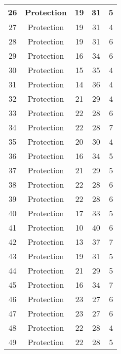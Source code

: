 \documentclass[results.tex]{subfiles}
\begin{document}
\begin{center}
\begin{tabular}{| c || c | c | c | c |}
    \hline
    26 & Protection & 19 & 31 & 5 \\ 
    \hline
    27 & Protection & 19 & 31 & 4 \\ 
    \hline
    28 & Protection & 19 & 31 & 6 \\ 
    \hline
    29 & Protection & 16 & 34 & 6 \\ 
    \hline
    30 & Protection & 15 & 35 & 4 \\ 
    \hline
    31 & Protection & 14 & 36 & 4 \\ 
    \hline
    32 & Protection & 21 & 29 & 4 \\ 
    \hline
    33 & Protection & 22 & 28 & 6 \\ 
    \hline
    34 & Protection & 22 & 28 & 7 \\ 
    \hline
    35 & Protection & 20 & 30 & 4 \\ 
    \hline
    36 & Protection & 16 & 34 & 5 \\ 
    \hline
    37 & Protection & 21 & 29 & 5 \\ 
    \hline
    38 & Protection & 22 & 28 & 6 \\ 
    \hline
    39 & Protection & 22 & 28 & 6 \\ 
    \hline
    40 & Protection & 17 & 33 & 5 \\ 
    \hline
    41 & Protection & 10 & 40 & 6 \\ 
    \hline
    42 & Protection & 13 & 37 & 7 \\ 
    \hline
    43 & Protection & 19 & 31 & 5 \\ 
    \hline
    44 & Protection & 21 & 29 & 5 \\ 
    \hline
    45 & Protection & 16 & 34 & 7 \\ 
    \hline
    46 & Protection & 23 & 27 & 6 \\ 
    \hline
    47 & Protection & 23 & 27 & 6 \\ 
    \hline
    48 & Protection & 22 & 28 & 4 \\ 
    \hline
    49 & Protection & 22 & 28 & 5 \\ 
    \hline   \end{tabular}
\end{center}
\end{document}
